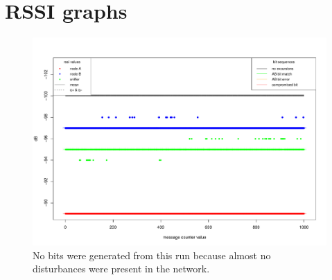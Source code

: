 \documentclass[
  print, %
  Table,   %
  nolof,     %
  nolot,     %
           oneside
]{fithesis3}
\begin{document}
\chapter{RSSI graphs}
\begin{figure}[h!!!]
  \includegraphics[height=\textwidth, angle = 90 ]{../images/graph_rssi_01.pdf}
\caption{No bits were generated from this run because almost no disturbances were present in the network.}
\label{fig:rssi_01}
\end{figure}
\end{document}
